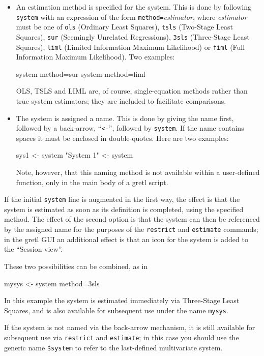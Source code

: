 \begin{itemize}
\item An estimation method is specified for the system. This is done
  by following \texttt{system} with an expression of the form
  \texttt{method=}\textsl{estimator}, where \textsl{estimator} must be
  one of \texttt{ols} (Ordinary Least Squares), \texttt{tsls}
  (Two-Stage Least Squares), \texttt{sur} (Seemingly Unrelated
  Regressions), \texttt{3sls} (Three-Stage Least Squares),
  \texttt{liml} (Limited Information Maximum Likelihood) or
  \texttt{fiml} (Full Information Maximum Likelihood). Two examples:
\begin{code}
system method=sur
system method=fiml
\end{code}
OLS, TSLS and LIML are, of course, single-equation methods rather than
true system estimators; they are included to facilitate comparisons.
\item The system is assigned a name. This is done by giving the name
  first, followed by a back-arrow, ``\verb|<-|'', followed by
  \texttt{system}.  If the name contains spaces it must be enclosed in
  double-quotes. Here are two examples:
\begin{code}
sys1 <- system
"System 1" <- system
\end{code}
Note, however, that this naming method is not available within a
user-defined function, only in the main body of a gretl script.
\end{itemize}

If the initial \texttt{system} line is augmented in the first way, the
effect is that the system is estimated as soon as its definition is
completed, using the specified method. The effect of the second option
is that the system can then be referenced by the assigned name for the
purposes of the \texttt{restrict} and \texttt{estimate} commands; in
the gretl GUI an additional effect is that an icon for the
system is added to the ``Session view''.

These two possibilities can be combined, as in
\begin{code}
mysys <- system method=3sls
\end{code}
In this example the system is estimated immediately via Three-Stage
Least Squares, and is also available for subsequent use under the
name \texttt{mysys}.

If the system is not named via the back-arrow mechanism, it is still
available for subsequent use via \texttt{restrict} and
\texttt{estimate}; in this case you should use the generic name
\verb|$system| to refer to the last-defined multivariate system.

